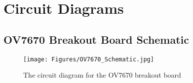 \chapter{Circuit Diagrams} \label{Chapter:AppendixA:CircuitDiagrams}
\section{OV7670 Breakout Board Schematic}
\begin{figure}
\texttt{[image: Figures/OV7670\_Schematic.jpg]} 
\caption{The circuit diagram for the OV7670 breakout board}
\label{OV7670_Schematic}

\end{figure}